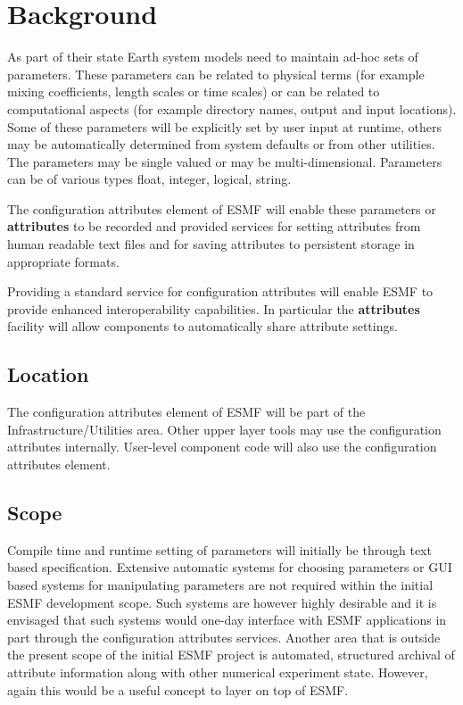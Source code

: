 
\section{Background}
As part of their state Earth system models need to maintain ad-hoc sets of
parameters. These parameters can be related to physical terms (for example
mixing coefficients, length scales or time scales) or can be related
to computational aspects (for example directory names, output and input
locations). Some of these parameters will be explicitly set by user
input at runtime, others may be automatically determined from system
defaults or from other utilities. The parameters may be single valued
or may be multi-dimensional. Parameters can be of various types float,
integer, logical, string.

The configuration attributes element of ESMF will enable
these parameters or {\bf attributes} to be recorded and provided services
for setting attributes from human readable text files and for saving attributes
to persistent storage in appropriate formats.

Providing a standard service for configuration attributes will enable ESMF
to provide enhanced interoperability capabilities. In particular the
{\bf attributes} facility will allow components to automatically
share attribute settings.

\subsection{Location}

The configuration attributes element of ESMF will be part of the
Infrastructure/Utilities area. Other upper layer tools may use the
configuration attributes internally. User-level component code will
also use the configuration attributes element.

\subsection{Scope}

Compile time and runtime setting of parameters will initially be through
text based specification. Extensive automatic systems for choosing parameters or GUI
based systems for manipulating parameters are not required within the 
initial ESMF development scope. Such systems are however highly desirable
and it is envisaged that such systems would one-day interface with ESMF applications
in part through the configuration attributes services.
Another area that is outside the present scope of the initial ESMF project is automated,
structured archival of attribute information along with other numerical
experiment state. However, again this would be a useful concept to layer on
top of ESMF.

